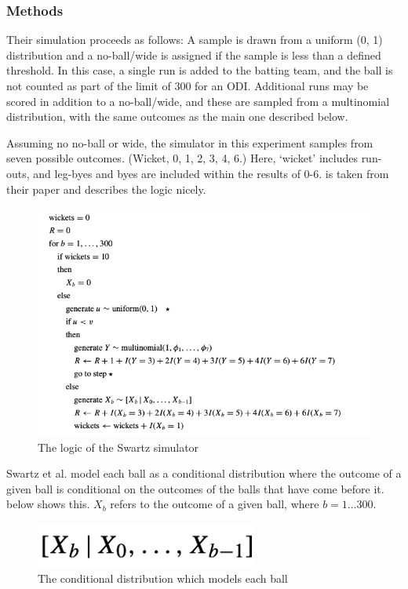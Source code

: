 \subsubsection{Methods}

Their simulation proceeds as follows:
A sample is drawn from a uniform (0, 1) distribution and a no-ball/wide is assigned if the sample is less than a defined threshold. In this case, a single run is added to the batting team, and the ball is not counted as part of the limit of 300 for an ODI. Additional runs may be scored in addition to a no-ball/wide, and these are sampled from a multinomial distribution, with the same outcomes as the main one described below.

Assuming no no-ball or wide, the simulator in this experiment samples from seven possible outcomes. (Wicket, 0, 1, 2, 3, 4, 6.) Here, ‘wicket’ includes run-outs, and leg-byes and byes are included within the results of 0-6.  is taken from their paper and describes the logic nicely.

\begin{figure}[h]
    \centering
    \includegraphics{images/swartz.png}
    \caption{The logic of the Swartz simulator}
    \label{fig:swartz model}
\end{figure}

Swartz et al. model each ball as a conditional distribution where the outcome of a given ball is conditional on the outcomes of the balls that have come before it.  below shows this. $X_{b}$ refers to the outcome of a given ball, where $b = 1…300$.

\begin{figure}
    \centering
    \includegraphics{images/swartz2.png}
    \caption{The conditional distribution which models each ball}
    \label{fig:swartz2}
\end{figure}

